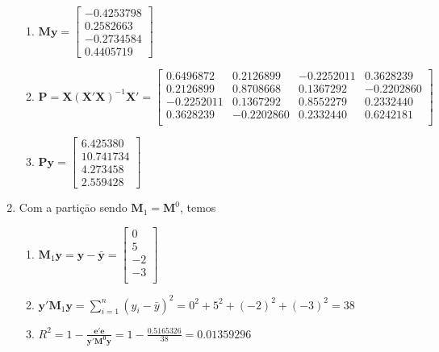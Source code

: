\documentclass[
  11pt,
]{article}
\begin{document}
\begin{enumerate}
\begin{enumerate}
  \item
    \(\mathbf{My}=  \begin{bmatrix}  -0.4253798 \\  0.2582663 \\  -0.2734584 \\  0.4405719  \end{bmatrix}\)
  \item
    \(\mathbf{P}=\mathbf{X}(\mathbf{X}'\mathbf{X})^{-1}\mathbf{X}'=  \begin{bmatrix}  0.6496872 & 0.2126899 & -0.2252011 & 0.3628239 \\  0.2126899 & 0.8708668 & 0.1367292 & -0.2202860 \\  -0.2252011 & 0.1367292 & 0.8552279 & 0.2332440 \\  0.3628239 & -0.2202860 & 0.2332440 & 0.6242181 \\  \end{bmatrix}\)
  \item
    \(\mathbf{Py}=  \begin{bmatrix}  6.425380 \\  10.741734 \\  4.273458 \\  2.559428  \end{bmatrix}\)
  \end{enumerate}
\item
  Com a partiçāo sendo \(\mathbf{M}_1=\mathbf{M}^0\), temos

  \begin{enumerate}
  \def\labelenumii{\alph{enumii}.}
  \item
    \(\mathbf{M}_1\mathbf{y}=\mathbf{y}-\mathbf{\bar{y}}=  \begin{bmatrix}  0 \\  5 \\  -2 \\  -3 \\  \end{bmatrix}\)
  \item
    \(\mathbf{y}'\mathbf{M}_1\mathbf{y}=\sum_{i=1}^n{(y_i-\bar{y})^2}=0^2+5^2+(-2)^2+(-3)^2=38\)
  \item
    \(R^2=1-\frac{\mathbf{e'e}}{\mathbf{y'M^0y}}=1- \frac{0.5165326}{38}=0.01359296\)
  \end{enumerate}
\end{enumerate}
\end{document}
